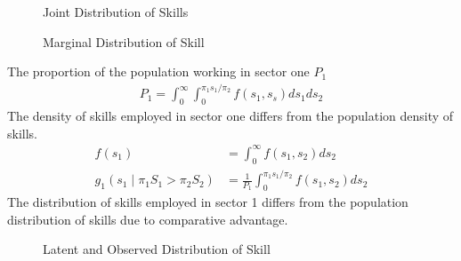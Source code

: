 \begin{frame}
	\begin{figure}[htp]\centering
		\caption{Joint Distribution of Skills}\label{Joint Distribution of Skills}
	\end{figure}
\end{frame}
\begin{frame}
	\begin{figure}[htp]\centering
		\caption{Marginal Distribution of Skill}\label{Marginal Distribution of Skill}
	\end{figure}
\end{frame}
\begin{frame}
	The proportion of the population working in sector one $P_1$
	\begin{align*}
	P_1 = \int^\infty_0 \int^{\pi_1 s_1 / \pi_2}_0 f(s_1, s_s) ds_1ds_2
	\end{align*}	
	The density of skills employed in sector one differs from the population density of skills.
	\begin{align*}
	f(s_1) & = \int^\infty_0 f(s_1, s_2) ds_2 \\
	g_1(s_1 \mid \pi_1 S_1 > \pi_2 S_2) & = \frac{1}{P_1} \int^{\pi_1 s_1 /\pi_2}_0 f(s_1, s_2) ds_2
	\end{align*}
	The distribution of skills employed in sector 1 differs from the population distribution of skills due to comparative advantage.
\end{frame}
\begin{frame}
	\begin{figure}[htp]\centering
		\caption{Latent and Observed Distribution of Skill}\label{Latent and Observed Distribution of Skill}
	\end{figure}
\end{frame}




